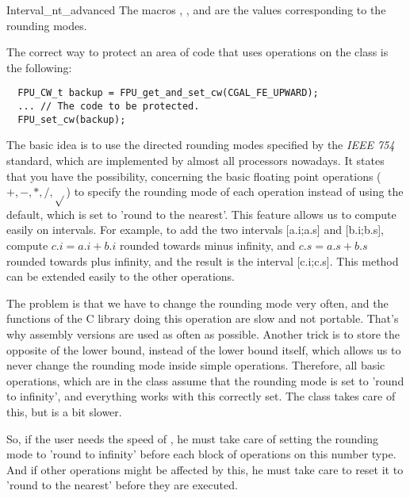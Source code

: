 \begin{ccRefClass} {Interval_nt_advanced}
The macros , ,
 and  are the values corresponding
to the rounding modes.

\ccExample

The correct way to protect an area of code that uses operations on the class
 is the following:

\begin{verbatim}
  FPU_CW_t backup = FPU_get_and_set_cw(CGAL_FE_UPWARD);
  ... // The code to be protected.
  FPU_set_cw(backup);
\end{verbatim}

\ccImplementation

The basic idea is to use the directed rounding modes specified by the 
{\it IEEE 754} standard, which are implemented by almost all processors 
nowadays.
It states that you have the possibility, concerning the basic floating point
operations ($+,-,*,/,\sqrt{}$) to specify the rounding mode of each operation
instead of using the default, which is set to 'round to the nearest'.
This feature allows us to compute easily on intervals.  For example, to
add the two intervals [a.i;a.s] and [b.i;b.s], compute $c.i=a.i+b.i$ rounded
towards minus infinity, and $c.s=a.s+b.s$ rounded towards plus infinity, and
the result is the interval [c.i;c.s].  This method can be extended easily to
the other operations.

The problem is that we have to change the rounding mode very often, and the
functions of the C library doing this operation are slow and not portable.
That's why assembly versions are used as often as possible.
Another trick is to store the opposite of the lower bound, instead of the
lower bound itself, which allows us to never change the rounding mode inside
simple operations.  Therefore, all basic operations, which are in the class 
 assume that the rounding mode is set to 
'round to infinity', and everything works with this correctly set.  
The class  takes care of this, but is a bit slower.

So, if the user needs the speed of , he must
take care of setting the rounding mode to 'round to infinity' before each
block of operations on this number type.  And if other operations might be
affected by this, he must take care to reset it to 'round to the nearest'
before they are executed.



\end{ccRefClass}

